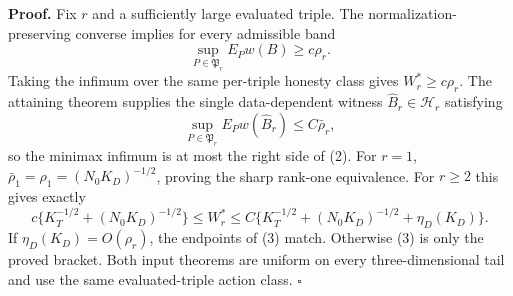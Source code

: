 \textbf{Proof.}
Fix \(r\) and a sufficiently large evaluated triple.  The normalization-preserving converse implies for every admissible band
\[
 \sup_{P\in\mathfrak P_r}E_Pw(B)\ge c\rho_r.             \tag{1}
\]
Taking the infimum over the same per-triple honesty class gives \(W_r^*\ge c\rho_r\).  The attaining theorem supplies the single data-dependent witness \(\widehat B_r\in\mathcal H_r\) satisfying
\[
 \sup_{P\in\mathfrak P_r}E_Pw(\widehat B_r)\le C\bar\rho_r, \tag{2}
\]
so the minimax infimum is at most the right side of (2).  For \(r=1\), \(\bar\rho_1=\rho_1=(N_0K_D)^{-1/2}\), proving the sharp rank-one equivalence.  For \(r\ge2\) this gives exactly
\[
 c\{K_T^{-1/2}+(N_0K_D)^{-1/2}\}
 \le W_r^*
 \le C\{K_T^{-1/2}+(N_0K_D)^{-1/2}+\eta_D(K_D)\}.       \tag{3}
\]
If \(\eta_D(K_D)=O(\rho_r)\), the endpoints of (3) match.  Otherwise (3) is only the proved bracket.  Both input theorems are uniform on every three-dimensional tail and use the same evaluated-triple action class. \(\square\)